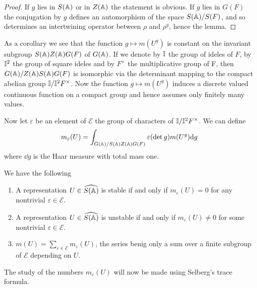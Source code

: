 \begin{proof}
If $g$ lies in $S(\mathbb{A})$ or in $Z(\mathbb{A})$ the statement is obvious.
If $g$ lies in $G(F)$ the conjugation by $g$ defines an automorphism of the space $S(\mathbb{A}) / S(F)$, and so determines an intertwining operator between $\rho$ and $\rho^g$, hence the lemma.
\end{proof}

As a corollary we see that the function $g \mapsto m(U^g)$ is constant on the invariant subgroup $S(\mathbb{A}) Z(\mathbb{A}) G(F)$ of $G(\mathbb{A})$.
If we denote by $\mathbb{I}$ the group of ideles of $F$, by $\mathbb{I}^2$ the group of square ideles and by $F^\times$ the multiplicative group of F, then $G(\mathbb{A}) / Z(\mathbb{A})S(\mathbb{A}) G(F)$ is isomorphic via the determinant mapping to the compact abelian group $\mathbb{I} / \mathbb{I}^2 F^\times$.
Now the function $g \mapsto m(U^g)$ induces a discrete valued continuous function on a compact group and hence assumes only finitely many values.

Now let $\varepsilon$ be an element of $\mathscr{E}$ the group of characters of $\mathbb{I} / \mathbb{I}^2 F^\times$. We can define
\[
    m_\varepsilon(U) = \int_{G(\mathbb{A}) / S(\mathbb{A}) Z(\mathbb{A}) G(F)} \varepsilon(\det g) m(U^g) \mathrm{d} g
\]
where $\dd g$ is the Haar measure with total mass one.

We have the following
\begin{lemma}
\begin{enumerate}
    \item A representation $U \in \widehat{S(\mathbb{A})}$ is stable if and only if $m_\varepsilon(U) = 0$ for any nontrivial $\varepsilon \in \mathscr{E}$.
    \item A representation $U \in \widehat{S(\mathbb{A})}$ is unstable if and only if $m_\varepsilon(U) \neq 0$ for some nontrivial $\varepsilon \in \mathscr{E}$.
    \item $m(U) = \sum_{\varepsilon \in \mathscr{E}} m_\varepsilon(U)$, the series benig only a sum over a finite subgroup of $\mathscr{E}$ depending on $U$.
\end{enumerate}
\end{lemma}

The study of the numbers $m_{\varepsilon}(U)$ will now be made using Selberg's trace formula.
